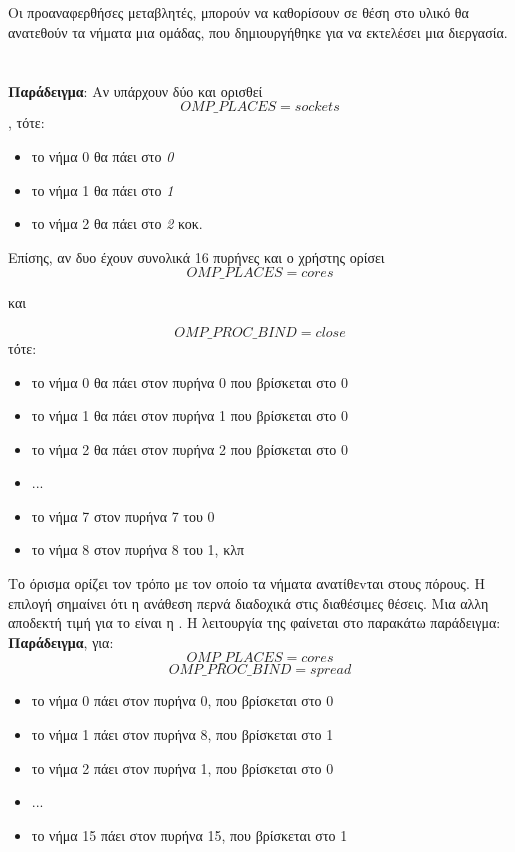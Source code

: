 \paragraph{\emph{}}
\subparagraph{}
Οι προαναφερθήσες μεταβλητές, μπορούν να καθορίσουν σε θέση στο υλικό θα ανατεθούν τα νήματα μια ομάδας, που δημιουργήθηκε για να εκτελέσει μια διεργασία.
\ \\
\ \\
\textbf{Παράδειγμα}: Αν υπάρχουν δύο \emph{} και ορισθεί $$OMP\_PLACES=sockets$$, τότε:
\begin{itemize}
\item{το νήμα 0 θα πάει στο \emph{ 0}}
\item{το νήμα 1 θα πάει στο \emph{ 1}}
\item{το νήμα 2 θα πάει στο \emph{ 2}} κοκ.
\end{itemize}

Επίσης, αν δυο \emph{} έχουν συνολικά 16 πυρήνες και ο χρήστης ορίσει $$OMP\_PLACES=cores$$ \begin{center}και\end{center} $$OMP\_PROC\_BIND=close$$ τότε:
\begin{itemize}
\item{το νήμα 0	θα πάει στον πυρήνα 0 που βρίσκεται στο \emph{} 0}
\item{το νήμα 1	θα πάει στον πυρήνα 1 που βρίσκεται στο \emph{} 0}
\item{το νήμα 2	θα πάει στον πυρήνα 2 που βρίσκεται στο \emph{} 0}
\item{...}
\item{το νήμα 7 στον πυρήνα 7 του \emph{} 0}
\item{το νήμα 8 στον πυρήνα 8 του \emph{} 1, κλπ}
\end{itemize}

\clearpage
Το όρισμα \emph{} ορίζει τον τρόπο με τον οποίο τα νήματα ανατίθεvται στους πόρους. Η επιλογή \emph{} σημαίνει ότι η ανάθεση περνά διαδοχικά στις διαθέσιμες θέσεις. Μια αλλη αποδεκτή τιμή για το \emph{} είναι η \emph{}. Η λειτουργία της φαίνεται στο παρακάτω παράδειγμα:
\ \\
\textbf{Παράδειγμα}, για:
$$OMP\_PLACES=cores$$
$$OMP\_PROC\_BIND=spread$$

\begin{itemize}
\item{το νήμα 0 πάει στον πυρήνα 0, που βρίσκεται στο \emph{} 0}
\item{το νήμα 1 πάει στον πυρήνα 8, που βρίσκεται στο \emph{} 1}
\item{το νήμα 2 πάει στον πυρήνα 1, που βρίσκεται στο \emph{} 0}
\item{...}
\item{το νήμα 15 πάει στον πυρήνα 15, που βρίσκεται στο \emph{} 1}
\end{itemize}

